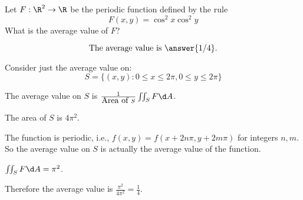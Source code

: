 \documentclass{ximera}
\author{Jim Fowler}
\begin{document}
\begin{exercise}
  
  Let $F : \R^2 \to \R$ be the periodic function defined by the rule
  \[
    F(x,y) = \cos^2 x \cos^2 y
  \]
  What is the average value of $F$?
  \begin{prompt}
    \[
      \mbox{The average value is } \answer{1/4}.
    \]
  \end{prompt}

  \begin{hint}
    Consider just the average value on:
    \[
    S=\{(x,y):0\le x \le 2\pi, 0 \le y \le 2\pi\}
    \]
  \end{hint}

  \begin{hint}
    The average value on $S$ is $\frac{1}{\mbox{Area of }S} \iint_S F \d A$.
  \end{hint}

  \begin{hint}
    The area of $S$ is $4\pi^2$.
  \end{hint}

  \begin{hint}
    The function is periodic, i.e., $f(x,y) = f(x+2n\pi, y+2m\pi)$ for integers $n,m$.  So the average value on $S$ is actually the average value of the function.
  \end{hint}

  \begin{hint}
    $\iint_S F \d A = \pi^2$.
  \end{hint}

  \begin{hint}
    Therefore the average value is $\frac{\pi^2}{4\pi^2} = \frac{1}{4}$.
  \end{hint}          
  
\end{exercise}
\end{document}
